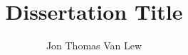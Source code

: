 \documentclass [PhD] {uclathes}
\title          {Dissertation Title}
\author         {Jon Thomas Van Lew}
\begin{document}
\makeintropages



%




%







%



\appendix

%




\end{document}
